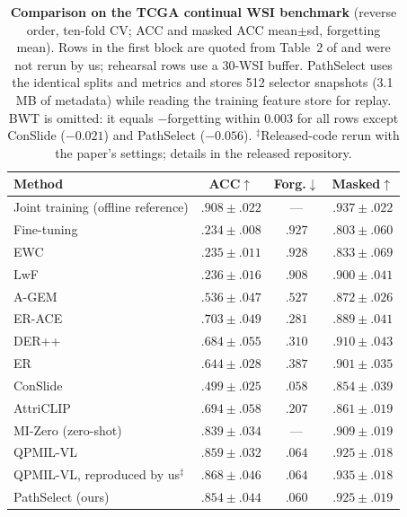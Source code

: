 \documentclass{article}
\begin{document}
\begin{table}[!t]
\centering\footnotesize\renewcommand{\arraystretch}{0.93}
\setlength{\tabcolsep}{3.5pt}
\caption{\textbf{Comparison on the TCGA continual WSI benchmark} (reverse order, ten-fold CV; ACC and masked ACC mean$\pm$sd, forgetting mean). Rows in the first block are quoted from Table~2 of \cite{gou2025qpmil} and were not rerun by us; rehearsal rows use a 30-WSI buffer. PathSelect uses the identical splits and metrics and stores 512 selector snapshots (3.1\,MB of metadata) while reading the training feature store for replay. BWT is omitted: it equals $-$forgetting within $0.003$ for all rows except ConSlide ($-0.021$) and PathSelect ($-0.056$). $^\ddagger$Released-code rerun with the paper's settings; details in the released repository.}
\label{tab:sota}
\begin{tabular}{lccc}
\toprule
Method & ACC$\uparrow$ & Forg.$\downarrow$ & Masked$\uparrow$ \\
\midrule
Joint training (offline reference) & $.908{\pm}.022$ & --- & $.937{\pm}.022$ \\
Fine-tuning & $.234{\pm}.008$ & $.927$ & $.803{\pm}.060$ \\
EWC \cite{kirkpatrick2017ewc} & $.235{\pm}.011$ & $.928$ & $.833{\pm}.069$ \\
LwF \cite{li2017lwf} & $.236{\pm}.016$ & $.908$ & $.900{\pm}.041$ \\
A-GEM \cite{chaudhry2019agem} & $.536{\pm}.047$ & $.527$ & $.872{\pm}.026$ \\
ER-ACE \cite{caccia2022erace} & $.703{\pm}.049$ & $.281$ & $.889{\pm}.041$ \\
DER++ \cite{buzzega2020derpp} & $.684{\pm}.055$ & $.310$ & $.910{\pm}.043$ \\
ER \cite{chaudhry2019er} & $.644{\pm}.028$ & $.387$ & $.901{\pm}.035$ \\
ConSlide \cite{huang2023conslide} & $.499{\pm}.025$ & $.058$ & $.854{\pm}.039$ \\
AttriCLIP \cite{wang2023attriclip} & $.694{\pm}.058$ & $.207$ & $.861{\pm}.019$ \\
MI-Zero \cite{lu2023mizero} (zero-shot) & $.839{\pm}.034$ & --- & $.909{\pm}.019$ \\
QPMIL-VL \cite{gou2025qpmil} & $.859{\pm}.032$ & $.064$ & $.925{\pm}.018$ \\
\midrule
QPMIL-VL, reproduced by us$^\ddagger$ & $.868{\pm}.046$ & $.064$ & $.935{\pm}.018$ \\
\midrule
PathSelect (ours) & $.854{\pm}.044$ & $.060$ & $.925{\pm}.019$ \\
\bottomrule
\end{tabular}
\end{table}
\end{document}
